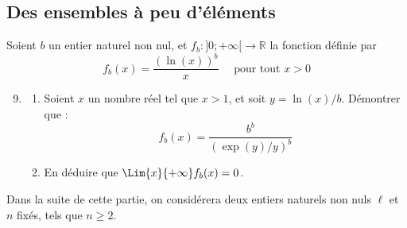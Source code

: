 \documentclass[landscape,twocolumn,leqno,a4paper,10pt]{report} %
\newcommand\n{\noindent}
\newcommand\q{\quad}
\renewcommand{\geq}{\geqslant}
\begin{document}
\subsection{Des ensembles à peu d'éléments}

\n Soient $b$ un entier naturel non nul, et $f_{b}:] 0 ;+\infty[\rightarrow \mathbb{R}$ la fonction définie par
$$f_{b}(x)=\frac{(\ln (x))^{b}}{x} \q \text { pour tout } x>0$$

\begin{enumerate}\setcounter{enumi}{8}
	\item \begin{enumerate}
		\item Soient $x$ un nombre réel tel que $x>1$, et soit $y=\ln (x) / b$. Démontrer que : 
		$$f_{b}(x)=\frac{b^{b}}{(\exp (y) / y)^{b}}$$
		\item En déduire que $\Lim{x}{+\infty} f_{b}(x)=0$.
	\end{enumerate}	 
\end{enumerate}

\n Dans la suite de cette partie, on considérera deux entiers naturels non nuls $\ell$ et $n$ fixés, tels que $n \geq 2$.
\end{document}
